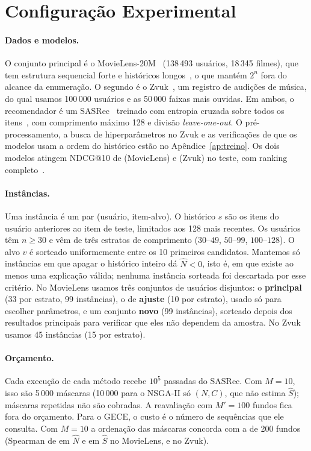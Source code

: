 \section{Configuração Experimental}

\paragraph{Dados e modelos.}
O conjunto principal é o MovieLens-20M~\cite{harper2015movielens} (138\,493
usuários, 18\,345 filmes), que tem estrutura sequencial forte e históricos
longos~\cite{klenitskiy2026patterns}, o que mantém $2^n$ fora do alcance da
enumeração. O segundo é o Zvuk~\cite{shevchenko2024zvuk}, um registro de
audições de música, do qual usamos 100\,000 usuários e as 50\,000 faixas mais
ouvidas. Em ambos, o recomendador é um SASRec~\cite{kang2018sasrec} treinado
com entropia cruzada sobre todos os itens~\cite{klenitskiy2023turning}, com
comprimento máximo 128 e divisão \emph{leave-one-out}. O pré-processamento, a
busca de hiperparâmetros no Zvuk e as verificações de que os modelos usam a
ordem do histórico estão no Apêndice~\ref{ap:treino}. Os dois modelos atingem
NDCG@10 de  (MovieLens) e 
(Zvuk) no teste, com ranking completo~\cite{krichene2020sampled}.

\paragraph{Instâncias.}
Uma instância é um par (usuário, item-alvo). O histórico $s$ são os itens do
usuário anteriores ao item de teste, limitados aos 128 mais recentes. Os
usuários têm $n\ge30$ e vêm de três estratos de comprimento ($30$--$49$,
$50$--$99$, $100$--$128$). O alvo $v$ é sorteado uniformemente entre os 10
primeiros candidatos. Mantemos só instâncias em que apagar o histórico inteiro
dá $\hat N<0$, isto é, em que existe ao menos uma explicação válida; nenhuma
instância sorteada foi descartada por esse critério. No MovieLens usamos três
conjuntos de usuários disjuntos: o \textbf{principal} (33 por estrato, 99
instâncias), o de \textbf{ajuste} (10 por estrato), usado só para escolher
parâmetros, e um conjunto \textbf{novo} (99 instâncias), sorteado depois dos
resultados principais para verificar que eles não dependem da amostra. No Zvuk
usamos 45 instâncias (15 por estrato).

\paragraph{Orçamento.}
Cada execução de cada método recebe $10^5$ passadas do SASRec. Com $M=10$,
isso são 5\,000 máscaras (10\,000 para o NSGA-II só $(N,C)$, que não estima
$\hat S$); máscaras repetidas não são cobradas. A reavaliação
com $M'=100$ fundos fica fora do orçamento. Para o GECE, o custo é o número de
sequências que ele consulta. Com $M=10$ a ordenação das máscaras concorda com a
de 200 fundos (Spearman de  em $\hat N$ e  em
$\hat S$ no MovieLens,  e  no Zvuk).

